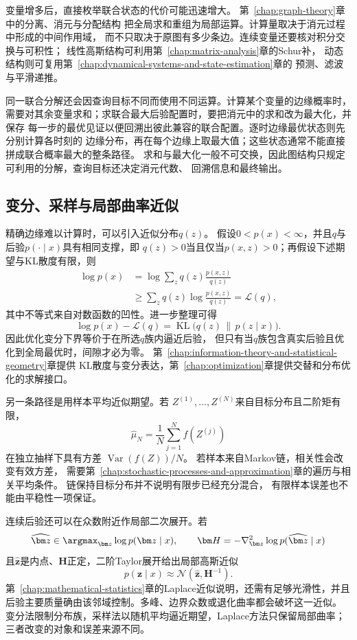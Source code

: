 变量增多后，直接枚举联合状态的代价可能迅速增大。
第~\ref{chap:graph-theory}章中的分离、消元与分配结构
把全局求和重组为局部运算。计算量取决于消元过程中形成的中间作用域，
而不只取决于原图有多少条边。连续变量还要核对积分交换与可积性；
线性高斯结构可利用第~\ref{chap:matrix-analysis}章的Schur补，
动态结构则可复用第~\ref{chap:dynamical-systems-and-state-estimation}章的
预测、滤波与平滑递推。

同一联合分解还会因查询目标不同而使用不同运算。计算某个变量的边缘概率时，
需要对其余变量求和；求联合最大后验配置时，要把消元中的求和改为最大化，并保存
每一步的最优见证以便回溯出彼此兼容的联合配置。逐时边缘最优状态则先分别计算各时刻的
边缘分布，再在每个边缘上取最大值；这些状态通常不能直接拼成联合概率最大的整条路径。
求和与最大化一般不可交换，因此图结构只规定可利用的分解，查询目标还决定消元代数、
回溯信息和最终输出。

\subsection{变分、采样与局部曲率近似}
\label{sec:future-exact-query-three-approximations}

精确边缘难以计算时，可以引入近似分布$q(z)$。
假设$0<p(x)<\infty$，并且$q$与后验$p(\cdot\mid x)$具有相同支撑，即
$q(z)>0$当且仅当$p(x,z)>0$；再假设下述期望与KL散度有限，则
\begin{align}
  \log p(x)
  &=
  \log
  \sum_z
  q(z)\frac{p(x,z)}{q(z)}
  \nonumber\\
  &\geq
  \sum_z
  q(z)
  \log\frac{p(x,z)}{q(z)}
  =
  \mathcal{L}(q),
  \label{eq:future-elbo}
\end{align}
其中不等式来自对数函数的凹性。进一步整理可得
\[
  \log p(x)-\mathcal{L}(q)
  =
  \operatorname{KL}\bigl(q(z)\,\|\,p(z\mid x)\bigr).
\]
因此优化变分下界等价于在所选$q$族内逼近后验，
但只有当$q$族包含真实后验且优化到全局最优时，间隙才必为零。
第~\ref{chap:information-theory-and-statistical-geometry}章提供
KL散度与变分表达，第~\ref{chap:optimization}章提供交替和分布优化的求解接口。

另一条路径是用样本平均近似期望。若
$Z^{(1)},\ldots,Z^{(N)}$来自目标分布且二阶矩有限，
\[
  \widehat\mu_N
  =
  \frac{1}{N}
  \sum_{j=1}^{N}f(Z^{(j)})
\]
在独立抽样下具有方差
$\operatorname{Var}(f(Z))/N$。
若样本来自Markov链，相关性会改变有效方差，
需要第~\ref{chap:stochastic-processes-and-approximation}章的遍历与相关平均条件。
链保持目标分布并不说明有限步已经充分混合，
有限样本误差也不能由平稳性一项保证。

连续后验还可以在众数附近作局部二次展开。若
\[
  \widehat{\bm z}
  \in
  \argmax_{\bm z}\log p(\bm z\mid x),
  \qquad
  \bm H
  =
  -\nabla^2_{\bm z}\log p(\widehat{\bm z}\mid x)
\]
且$\widehat{\bm z}$是内点、$\bm H$正定，二阶Taylor展开给出局部高斯近似
\[
  p(\bm z\mid x)
  \approx
  \mathcal N(\widehat{\bm z},\bm H^{-1}).
\]
第~\ref{chap:mathematical-statistics}章的Laplace近似说明，还需有足够光滑性，并且
后验主要质量确由该邻域控制。多峰、边界众数或退化曲率都会破坏这一近似。
变分法限制分布族，采样法以随机平均逼近期望，Laplace方法只保留局部曲率；
三者改变的对象和误差来源不同。

